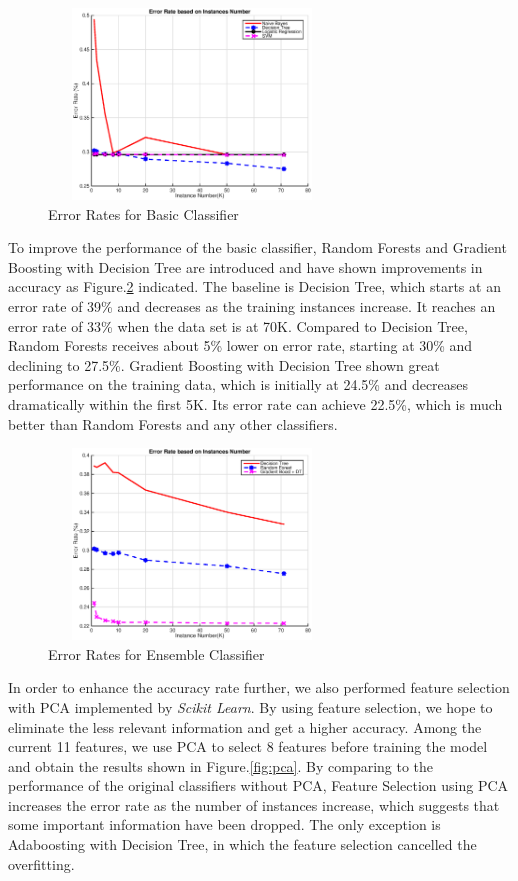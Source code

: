\documentclass{sig-alternate-05-2015}
\begin{document}
\begin{figure}[!htb]
\centering
\includegraphics[height=2in, width=3in]{Basic_Classifiers_2}
\caption{Error Rates for Basic Classifier}
\label{fig:basic classifier}
\end{figure}

To improve the performance of the basic classifier, Random Forests and Gradient Boosting with Decision Tree are introduced and have shown improvements in accuracy as Figure.\ref{fig:ensemble classifier} indicated.  The baseline is Decision Tree, which starts at an error rate of 39\% and decreases as the training instances increase. It reaches an error rate of 33\% when the data set is at 70K. Compared to Decision Tree, Random Forests receives about 5\% lower on error rate, starting at 30\% and declining to 27.5\%. Gradient Boosting with Decision Tree shown great performance on the training data, which is initially at 24.5\% and decreases dramatically within the first 5K. Its error rate can achieve 22.5\%, which is much better than Random Forests and any other classifiers.

\begin{figure}[!htb]
\centering
\includegraphics[height=2in, width=3in]{Ensemble_Classifiers_2}
\caption{Error Rates for Ensemble Classifier}
\label{fig:ensemble classifier}
\end{figure}

In order to enhance the accuracy rate further, we also performed feature selection with PCA implemented by \emph{Scikit Learn}. By using feature selection, we hope to eliminate the less relevant information and get a higher accuracy. Among the current 11 features, we use PCA to select 8 features before training the model and obtain the results shown in Figure.\ref{fig:pca}. By comparing to the performance of the original classifiers without PCA, Feature Selection using PCA increases the error rate as the number of instances increase, which suggests that some important information have been dropped. The only exception is Adaboosting with Decision Tree, in which the feature selection cancelled the overfitting.
\end{document}
